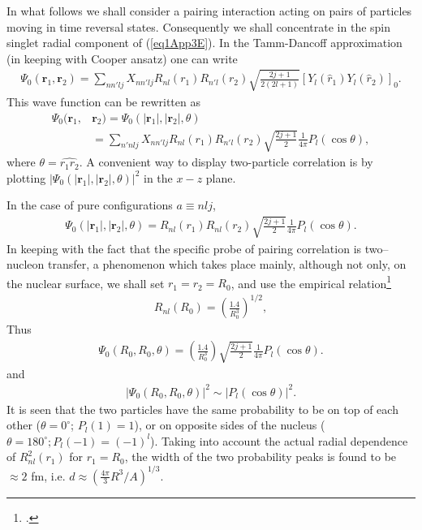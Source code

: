 In what follows we shall consider a pairing interaction acting on pairs of particles moving in time reversal states. Consequently we shall concentrate in the spin singlet radial component of (\ref{eq1App3E}). In the Tamm-Dancoff approximation (in keeping with Cooper ansatz) one can write
\begin{align}\label{eq2App3E}
\Psi_0(\mathbf r_1,\mathbf r_2)=\sum_{nn'lj}X_{nn'lj}R_{nl}(r_1)R_{n'l}(r_2)\sqrt{\frac{2j+1}{2(2l+1)}}\left[Y_l(\hat r_1)Y_l(\hat r_2)\right]_0.
\end{align}
This wave function can be rewritten as
\begin{align}\label{eq3App3Ex}
\nonumber\Psi_0(\mathbf r_1,&\mathbf r_2)=\Psi_0(|\mathbf r_1|,|\mathbf r_2|,\theta)\\
&=\sum_{n'nlj}X_{nn'lj}R_{nl}(r_1)R_{n'l}(r_2)\sqrt{\frac{2j+1}{2}}\frac{1}{4\pi}P_l(\cos\theta),
\end{align}
where $\theta=\widehat{r_1r_2}$. A convenient way to display two-particle correlation is by plotting $|\Psi_0(|\mathbf r_1|,|\mathbf r_2|,\theta)|^2$ in the $x-z$ plane.


In the case of pure configurations $a\equiv nlj$,
\begin{align}\label{eq4App3Ex}
\Psi_0(|\mathbf r_1|,|\mathbf r_2|,\theta)
=R_{nl}(r_1)R_{nl}(r_2)\sqrt{\frac{2j+1}{2}}\frac{1}{4\pi}P_l(\cos\theta).
\end{align}
In keeping with the fact that the specific probe of pairing correlation is two--nucleon transfer, a phenomenon which takes place mainly, although not only, on the nuclear surface, we shall set $r_1=r_2=R_0$, and use the empirical relation\footnote{\cite{Bohr:69}.}
\begin{align}\label{eq5App3Ex}
R_{nl}(R_0)=\left(\frac{1.4}{R_0^3}\right)^{1/2},
\end{align}
Thus 
\begin{align}\label{eq6App3E}
\Psi_0(R_0,R_0,\theta)
=\left(\frac{1.4}{R_0^3}\right)\sqrt{\frac{2j+1}{2}}\frac{1}{4\pi}P_l(\cos\theta).
\end{align}
and 
\begin{align}\label{eq7App3E}
|\Psi_0(R_0,R_0,\theta)|^2\sim |P_l(\cos\theta)|^2.
\end{align}
It is seen that the two particles have the same probability to be on top of each other ($\theta=0^\circ$; $P_l(1)=1$), or on opposite sides of the nucleus ($\theta=180^\circ; P_l(-1)=(-1)^l$). Taking into account the actual radial dependence of $R^2_{nl}(r_1)$ for $r_1=R_0$, the width of the two probability peaks is found to be $\approx 2$ fm, i.e. $d\approx\left(\frac{4\pi}{3}R^3/A\right)^{1/3}$.

